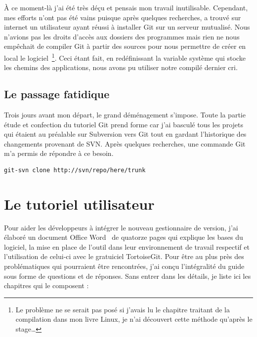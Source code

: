 À ce moment-là j'ai été très déçu et pensais mon travail inutilisable.
Cependant, mes efforts n'ont pas été vains puisque  après
quelques recherches, a trouvé sur internet un utilisateur ayant réussi à
installer Git sur un serveur mutualisé.  Nous n'avions pas les droits
d'accès aux dossiers des programmes mais rien ne nous empêchait de
compiler Git à partir des sources pour nous permettre de créer en local
le logiciel\, \footnote{Le problème ne se serait pas posé si j'avais lu
le chapitre traitant de la compilation dans mon livre Linux, je n'ai
découvert cette méthode qu'après le stage\dots}. Ceci étant fait, en
redéfinissant la variable système qui stocke les chemins des
applications, nous avons pu utiliser notre compilé dernier cri.

\subsection{Le passage fatidique} %
\label{sub:Le passage fatidique}

Trois jours avant mon départ, le grand déménagement s'impose. Toute la
partie étude et confection du tutoriel Git prend forme car j'ai basculé
tous les projets qui étaient au préalable sur Subversion vers Git tout
en gardant l'historique des changements provenant de SVN. Après quelques
recherches, une commande Git m'a permis de répondre à ce besoin.\\

\begin{lstlisting}[basicstyle=\ttfamily\small, frame=trBL]
git-svn clone http://svn/repo/here/trunk
\end{lstlisting}

\section{Le tutoriel utilisateur} %
\label{sec:Le tutoriel utilisateur}

Pour aider les développeurs à intégrer le nouveau gestionnaire de
version, j'ai élaboré un document Office Word~\textregistered{} de
quatorze pages qui explique les bases du logiciel, la mise en place de
l'outil dans leur environnement de travail respectif et l'utilisation de
celui-ci avec le gratuiciel TortoiseGit.  Pour être au plus près des
problématiques qui pourraient être rencontrées, j'ai conçu l'intégralité
du guide sous forme de questions et de réponses. Sans entrer dans les
détails, je liste ici les chapitres qui le composent :


